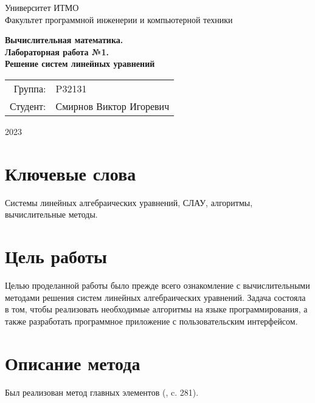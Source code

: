 \documentclass{article}
\begin{document}
\begin{titlepage}
    \begin{center}
        \begin{spacing}{1.4}
            \large{Университет ИТМО} \\
            \large{Факультет программной инженерии и компьютерной техники} \\
        \end{spacing}
        \vfill
        \textbf{
            \huge{Вычислительная математика.} \\
            \huge{Лабораторная работа №1.} \\
            \huge{Решение систем линейных уравнений} \\
        }
    \end{center}
    \vfill
    \begin{center}
        \begin{tabular}{r l}
            Группа:  & P32131                  \\
            Студент: & Смирнов Виктор Игоревич \\
        \end{tabular}
    \end{center}
    \vfill
    \begin{center}
        \begin{large}
            2023
        \end{large}
    \end{center}
\end{titlepage}

\section*{Ключевые слова}
Системы линейных алгебраических уравнений, СЛАУ, алгоритмы,
вычислительные методы.

\section{Цель работы}
Целью проделанной работы было прежде всего ознакомление с
вычислительными методами решения систем линейных алгебраических
уравнений. Задача состояла в том, чтобы реализовать необходимые
алгоритмы на языке программирования, а также разработать
программное приложение с пользовательским интерфейсом.

\section{Описание метода}
Был реализован метод главных элементов
(\cite{calc-math-demidovich-maron}, c. 281).
\end{document}
